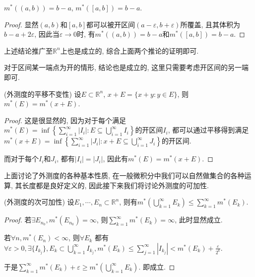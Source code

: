 \documentclass[theorem=false,mathfont=none,openany,sub3section]{easybook}
\begin{document}
\begin{corollary}
  $m^{*}((a,b))=b-a$, $m^{*}([a,b])=b-a$.\par
\end{corollary}

\begin{proof}
  显然$(a,b)$和$[a,b]$都可以被开区间$(a-\varepsilon,b+\varepsilon)$所覆盖, 且其体积为$b-a+2\varepsilon$, 因此当$\varepsilon \to 0$时, 有$m^{*}((a,b))=b-a$和$m^{*}([a,b])=b-a$.\par
\end{proof}

\begin{remark}
  上述结论推广至$\mathbb{R}^n$上也是成立的, 综合上面两个推论的证明即可.\par
  对于区间某一端点为开的情形, 结论也是成立的, 这里只需要考虑开区间的另一端即可.\par
\end{remark}

\begin{theorem}
  (外测度的平移不变性) 设$E\subset \mathbb{R}^n$, $x+E=\{x+y:y\in E\}$, 则$m^{*}(E)=m^{*}(x+E)$.\par
\end{theorem}

\begin{proof}
  这是很显然的, 因为对于每个满足$m^{*}(E)=\inf\left\{\sum_{i=1}^{\infty}|I_i|: E\subseteq \bigcup_{i=1}^{\infty}I_i\right\}$的开区间$I_i$, 都可以通过平移得到满足$m^{*}(x+E)=\inf\left\{\sum_{i=1}^{\infty}|J_i|: x+E\subseteq \bigcup_{i=1}^{\infty}J_i\right\}$的开区间.\par
  而对于每个$I_i$和$J_i$, 都有$|I_i|=|J_i|$, 因此有$m^{*}(E)=m^{*}(x+E)$.\par
\end{proof}

上面讨论了外测度的各种基本性质, 在一般微积分中我们可以自然做集合的各种运算, 其长度都是良好定义的, 因此接下来我们将讨论外测度的可加性.\par

\begin{theorem}
  (外测度的次可加性) 设$E_1, \cdots, E_n\subset \mathbb{R}^n$, 则有$m^{*}\left(\bigcup_{k=1}^{\infty}E_k\right)\leqslant \sum_{k=1}^{\infty}m^{*}(E_k)$.\par
\end{theorem}

\begin{proof}
  若$\exists E_{n_0}, m^{*}(E_{n_0})=\infty$, 则$\sum_{k=1}^{\infty}m^{*}(E_k)=\infty$, 此时显然成立.\par
  若$\forall n, m^{*}(E_n)<\infty$, 则$\forall E_k$ 都有$\forall \varepsilon >0, \exists \{I_{k_j}\}, E_k\subset \bigcup_{k=1}^{\infty}I_{k_j}, m^{*}(E_k)\leqslant \sum_{j=1}^{\infty}|I_{k_j}|<m^{*}(E_k)+\frac{\varepsilon}{2^k}$.\par
  于是$\sum_{k=1}^{\infty}m^{*}(E_k)+\varepsilon \geqslant m^{*}(\bigcup_{k=1}^{\infty}E_k)$. 即成立.\par
\end{proof}
\end{document}
